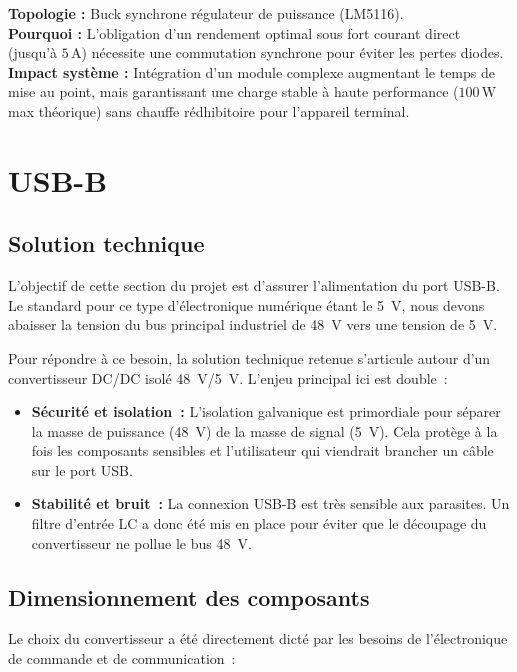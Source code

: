 \begin{decisionbox}
\textbf{Topologie :} Buck synchrone régulateur de puissance (LM5116). \\
\textbf{Pourquoi :} L'obligation d'un rendement optimal sous fort courant direct (jusqu'à $5 \, \text{A}$) nécessite une commutation synchrone pour éviter les pertes diodes. \\
\textbf{Impact système :} Intégration d'un module complexe augmentant le temps de mise au point, mais garantissant une charge stable à haute performance ($100 \, \text{W}$ max théorique) sans chauffe rédhibitoire pour l'appareil terminal.
\end{decisionbox}

    \section{USB-B}
        \subsection{Solution technique}
        L'objectif de cette section du projet est d'assurer l'alimentation du port USB-B. Le standard pour ce type d'électronique numérique étant le 5~V, nous devons abaisser la tension du bus principal industriel de 48~V vers une tension de 5~V.

        Pour répondre à ce besoin, la solution technique retenue s'articule autour d'un convertisseur DC/DC isolé 48~V/5~V. L'enjeu principal ici est double~:
        \begin{itemize}
            \item \textbf{Sécurité et isolation~:} L'isolation galvanique est primordiale pour séparer la masse de puissance (48~V) de la masse de signal (5~V). Cela protège à la fois les composants sensibles et l'utilisateur qui viendrait brancher un câble sur le port USB.
            \item \textbf{Stabilité et bruit~:} La connexion USB-B est très sensible aux parasites. Un filtre d'entrée LC a donc été mis en place pour éviter que le découpage du convertisseur ne pollue le bus 48~V.
        \end{itemize}

        \subsection{Dimensionnement des composants}
        Le choix du convertisseur a été directement dicté par les besoins de l'électronique de commande et de communication~:

